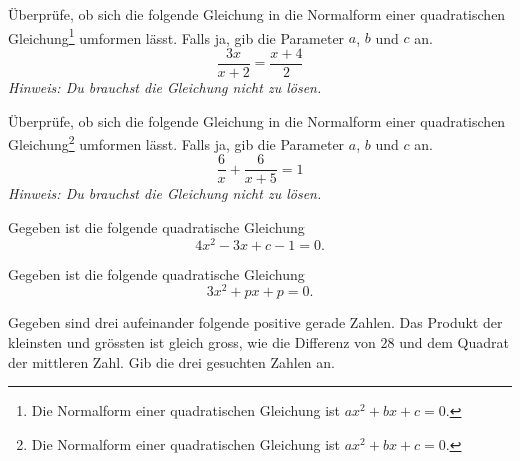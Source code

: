 \documentclass[11pt]{exam}
\begin{document}
\begin{questions}
\question[4]
Überprüfe, ob sich die folgende Gleichung in die Normalform einer quadratischen Gleichung\footnote{Die Normalform einer quadratischen Gleichung ist $ax^2+bx+c=0$.} umformen lässt. Falls ja, gib die Parameter $a$, $b$ und $c$ an.
\[\frac{3x}{x+2}=\frac{x+4}{2}\]
\textit{Hinweis: Du brauchst die Gleichung nicht zu lösen.}

\question[4]
Überprüfe, ob sich die folgende Gleichung in die Normalform einer quadratischen Gleichung\footnote{Die Normalform einer quadratischen Gleichung ist $ax^2+bx+c=0$.} umformen lässt. Falls ja, gib die Parameter $a$, $b$ und $c$ an.
\[\frac{6}{x}+\frac{6}{x+5}=1\]
\textit{Hinweis: Du brauchst die Gleichung nicht zu lösen.}

\noaddpoints
\question[\totalpoints]
\addpoints
Gegeben ist die folgende quadratische Gleichung
\[4x^2-3x+c-1=0.\]

\noaddpoints
\question[\totalpoints]
\addpoints
Gegeben ist die folgende quadratische Gleichung
\[3x^2+px+p=0.\]

\question[5]
Gegeben sind drei aufeinander folgende positive gerade Zahlen. Das Produkt der kleinsten und grössten ist gleich gross, wie die Differenz von $28$ und dem Quadrat der mittleren Zahl. Gib die drei gesuchten Zahlen an.



\end{questions}
\end{document}

